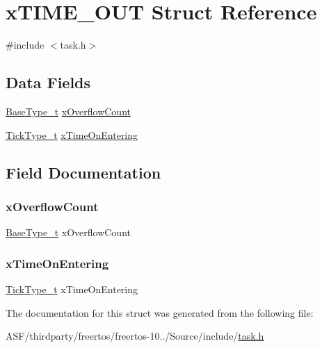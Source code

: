 \hypertarget{structx_t_i_m_e___o_u_t}{}\section{x\+T\+I\+M\+E\+\_\+\+O\+UT Struct Reference}
\label{structx_t_i_m_e___o_u_t}


{\ttfamily \#include $<$task.\+h$>$}

\subsection*{Data Fields}
\begin{DoxyCompactItemize}
\item 
\mbox{\hyperlink{portmacro_8h_a46fb21e00ae0729d7515c0fbf2269796}{Base\+Type\+\_\+t}} \mbox{\hyperlink{structx_t_i_m_e___o_u_t_a5d03952a36301f2056265f3fff437b55}{x\+Overflow\+Count}}
\item 
\mbox{\hyperlink{portmacro_8h_aa69c48c6e902ce54f70886e6573c92a9}{Tick\+Type\+\_\+t}} \mbox{\hyperlink{structx_t_i_m_e___o_u_t_adebf6236514a7e0fa24464dcf4100f14}{x\+Time\+On\+Entering}}
\end{DoxyCompactItemize}


\subsection{Field Documentation}
\mbox{\label{structx_t_i_m_e___o_u_t_a5d03952a36301f2056265f3fff437b55}} 
\subsubsection{\texorpdfstring{xOverflowCount}{xOverflowCount}}
{\footnotesize\ttfamily \mbox{\hyperlink{portmacro_8h_a46fb21e00ae0729d7515c0fbf2269796}{Base\+Type\+\_\+t}} x\+Overflow\+Count}

\mbox{\label{structx_t_i_m_e___o_u_t_adebf6236514a7e0fa24464dcf4100f14}} 
\subsubsection{\texorpdfstring{xTimeOnEntering}{xTimeOnEntering}}
{\footnotesize\ttfamily \mbox{\hyperlink{portmacro_8h_aa69c48c6e902ce54f70886e6573c92a9}{Tick\+Type\+\_\+t}} x\+Time\+On\+Entering}



The documentation for this struct was generated from the following file\+:\begin{DoxyCompactItemize}
\item 
A\+S\+F/thirdparty/freertos/freertos-\/10../\+Source/include/\mbox{\hyperlink{task_8h}{task.\+h}}\end{DoxyCompactItemize}
